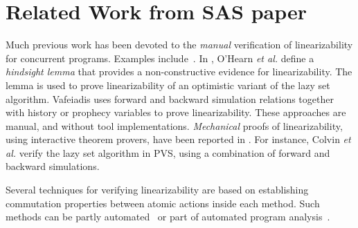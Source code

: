 \section{Related Work from SAS paper}
Much previous work has been devoted to
the {\it manual} verification of linearizability for
concurrent programs. Examples
include~\cite{LF:pldi13,Aaron:logical:linearizability}.
%
In \cite{OHearnlist}, O'Hearn {\it et al.}  define a
{\it hindsight lemma} that
provides a non-constructive evidence for linearizability. 
%
The lemma is used to prove linearizability of an optimistic variant of 
the lazy set algorithm.
Vafeiadis \cite{Vafeiadis:Thesis}
uses forward and backward simulation relations together
with history or prophecy variables to prove linearizability.
%
These approaches are manual, and without
tool implementations.
{\it Mechanical} proofs of linearizability, using interactive theorem
provers, have been reported in 
\cite{Colvin:Lazy-List,Derrick:fm14,SWD:cav12,SDW:tcl14}.
%
For instance, Colvin {\it et al.} \cite{Colvin:Lazy-List}
verify the lazy set algorithm in  PVS,
using a combination of forward and backward simulations.

Several techniques for verifying linearizability are based on establishing
commutation properties between atomic actions inside each method.
Such methods can be partly automated~\cite{EQSST:tacas10,singh:issre16}
or part of automated program analysis~\cite{LMP:cav14}.

